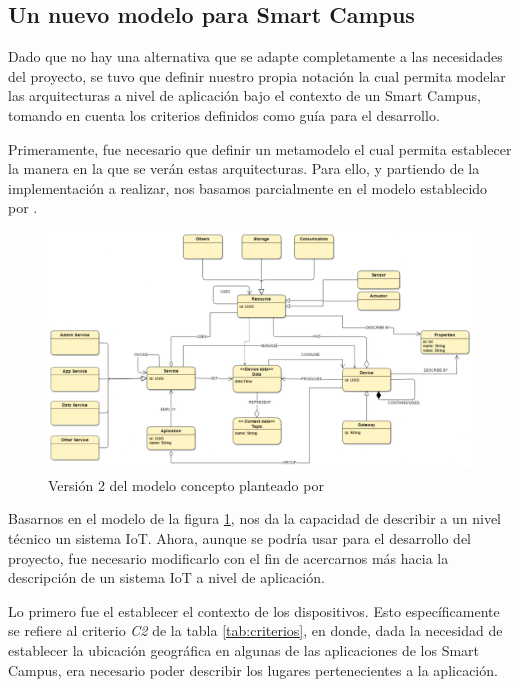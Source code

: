 \subsection{Un nuevo modelo para Smart Campus}

Dado que no hay una alternativa que se adapte completamente a las necesidades del proyecto, se tuvo que definir nuestro propia notación la cual permita modelar las arquitecturas a nivel de aplicación bajo el contexto de un Smart Campus, tomando en cuenta los criterios definidos como guía para el desarrollo.

Primeramente, fue necesario que definir un metamodelo el cual permita establecer la manera en la que se verán estas arquitecturas. Para ello, y partiendo de la implementación a realizar, nos basamos parcialmente en el modelo establecido por . 

\begin{figure}[H]
    \centering
    \caption{Versión 2 del modelo concepto planteado por}
    \label{fig:henrymodelo}
    \vspace{2mm}

    \includegraphics[width=\linewidth]{images/Henrymodelo.png}
\end{figure}

Basarnos en el modelo de la figura \ref{fig:henrymodelo}, nos da la capacidad de describir a un nivel técnico un sistema IoT. Ahora, aunque se podría usar para el desarrollo del proyecto, fue necesario modificarlo con el fin de acercarnos más hacia la descripción de un sistema IoT a nivel de aplicación. 

Lo primero fue el establecer el contexto de los dispositivos. Esto específicamente se refiere al criterio \textit{C2} de la tabla \ref{tab:criterios}, en donde, dada la necesidad de establecer la ubicación geográfica en algunas de las aplicaciones de los Smart Campus, era necesario poder describir los lugares pertenecientes a la aplicación.

